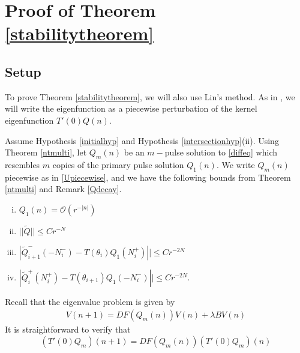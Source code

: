 \documentclass[12pt]{article}
\begin{document}
\section{Proof of Theorem \ref{stabilitytheorem}}

\subsection{Setup}

To prove Theorem \ref{stabilitytheorem}, we will also use Lin's method. As in \cite{Sandstede1998}, we will write the eigenfunction as a piecewise perturbation of the kernel eigenfunction $T'(0)Q(n)$. 

Assume Hypothesis \ref{initialhyp} and Hypothesis \ref{intersectionhyp}(ii). Using Theorem \ref{ntmulti}, let $Q_m(n)$ be an $m-$pulse solution to \eqref{diffeq} which resembles $m$ copies of the primary pulse solution $Q_1(n)$. We write $Q_m(n)$ piecewise as in \eqref{Upiecewise}, and we have the following bounds from Theorem \ref{ntmulti} and Remark \ref{Qdecay}.
\begin{enumerate}[(i)]
\item $Q_1(n) = \mathcal{O}(r^{-|n|})$
\item $||\tilde{Q}|| \leq C r^{-N}$
\item $|\tilde{Q}_{i+1}^-(-N_i^-) - T(\theta_i) Q_1(N_i^+)|| \leq C r^{-2N}$ 
\item $|\tilde{Q}_i^+(N_i^+) - T(\theta_{i+1}) Q_1(-N_i^-)|| \leq C r^{-2N}$.
\end{enumerate}

Recall that the eigenvalue problem is given by 
\begin{align*}
V(n+1) = DF(Q_m(n)) V(n) + \lambda B V(n)
\end{align*}
It is straightforward to verify that 
\begin{equation}\label{DFkernel1}
(T'(0)Q_m)(n+1) = DF(Q_m(n))(T'(0)Q_m)(n)
\end{equation}
\end{document}

